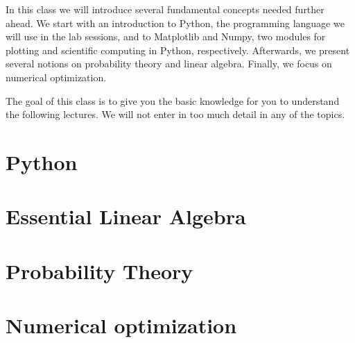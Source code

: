 
In this class we will introduce several fundamental concepts needed further ahead. We start with an introduction to Python, the programming language we will use in the lab sessions, and to Matplotlib and Numpy, two modules for plotting and scientific computing in Python, respectively. Afterwards, we present several notions on probability theory and linear algebra. Finally, we focus on numerical optimization. 

The goal of this class is to give you the basic knowledge for you to understand the following lectures. We will not enter in too much detail in any of the topics. 


\section{Python}


\section{Essential Linear Algebra}


\section{Probability Theory}


\section{Numerical optimization\label{numerical_optimization}}








